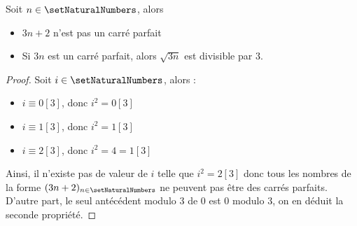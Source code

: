 \begin{lemma}
Soit $n \in \setNaturalNumbers$, alors 
\begin{itemize}
\item $3 n + 2$ n'est pas un carré parfait
\item Si $3 n$ est un carré parfait, alors $\sqrt{3 n}$ est divisible par $3$. 
\end{itemize}
\end{lemma}

\begin{proof}
Soit $i \in \setNaturalNumbers$, alors : 
\begin{itemize}
\item $i \equiv 0 [3]$, donc $i^2 = 0[3]$
\item $i \equiv 1 [3]$, donc $i^2 = 1[3]$
\item $i \equiv 2 [3]$, donc $i^2 = 4 = 1[3]$
\end{itemize}
Ainsi, il n'existe pas de valeur de $i$ telle que $i^2 = 2[3]$ donc tous les nombres de la forme $(3n +2)_{n \in \setNaturalNumbers}$ ne peuvent pas être des carrés parfaits. \\
D'autre part, le seul antécédent modulo $3$ de $0$ est $0$ modulo $3$, on en déduit la seconde propriété.
\end{proof}